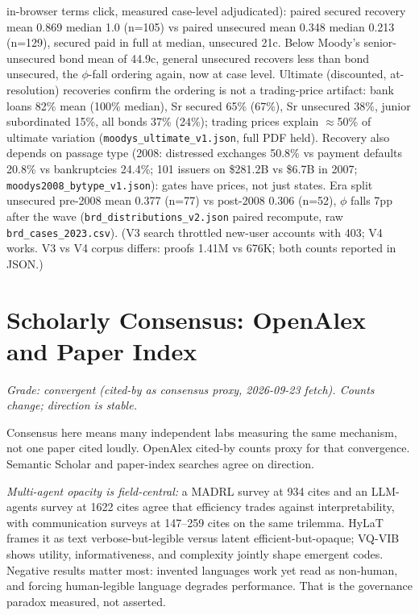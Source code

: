 \documentclass[11pt]{article}
\begin{document}
in-browser terms click, measured case-level adjudicated): paired secured recovery mean 0.869 median 1.0 (n=105) vs paired unsecured mean 0.348 median 0.213 (n=129), secured paid in full at median, unsecured 21c. Below Moody's senior-unsecured bond mean of 44.9c, general unsecured recovers less than bond unsecured, the $\phi$-fall ordering again, now at case level. Ultimate (discounted, at-resolution) recoveries confirm the ordering is not a trading-price artifact: bank loans 82\% mean (100\% median), Sr secured 65\% (67\%), Sr unsecured 38\%, junior subordinated 15\%, all bonds 37\% (24\%); trading prices explain $\approx$50\% of ultimate variation (\texttt{moodys\_ultimate\_v1.json}, full PDF held). Recovery also depends on passage type (2008: distressed exchanges 50.8\% vs payment defaults 20.8\% vs bankruptcies 24.4\%; 101 issuers on \$281.2B vs \$6.7B in 2007; \texttt{moodys2008\_bytype\_v1.json}): gates have prices, not just states. Era split unsecured pre-2008 mean 0.377 (n=77) vs post-2008 0.306 (n=52), $\phi$ falls 7pp after the wave (\texttt{brd\_distributions\_v2.json} paired recompute, raw \texttt{brd\_cases\_2023.csv}). (V3 search throttled new-user accounts with 403; V4 works. V3 vs V4 corpus differs: proofs 1.41M vs 676K; both counts reported in JSON.)

\section{Scholarly Consensus: OpenAlex and Paper Index}
\label{sec:openalex-scholar}

\textit{Grade: convergent (cited-by as consensus proxy, 2026-09-23 fetch). Counts change; direction is stable.}

Consensus here means many independent labs measuring the same mechanism, not one paper cited loudly. OpenAlex cited-by counts proxy for that convergence. Semantic Scholar and paper-index searches agree on direction.

\textit{Multi-agent opacity is field-central:} a MADRL survey at 934 cites and an LLM-agents survey at 1622 cites agree that efficiency trades against interpretability, with communication surveys at 147--259 cites on the same trilemma. HyLaT frames it as text verbose-but-legible versus latent efficient-but-opaque; VQ-VIB shows utility, informativeness, and complexity jointly shape emergent codes. Negative results matter most: invented languages work yet read as non-human, and forcing human-legible language degrades performance. That is the governance paradox measured, not asserted.
\end{document}
